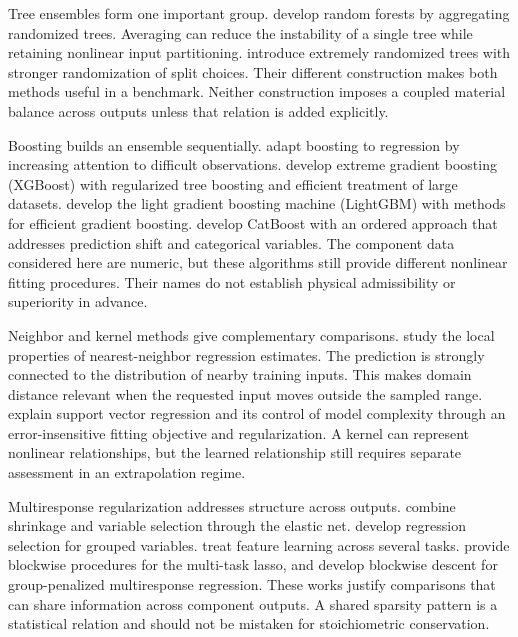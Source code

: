 Tree ensembles form one important group. \citet{Breiman2001} develop random forests by aggregating randomized trees. Averaging can reduce the instability of a single tree while retaining nonlinear input partitioning. \citet{Geurts2006} introduce extremely randomized trees with stronger randomization of split choices. Their different construction makes both methods useful in a benchmark. Neither construction imposes a coupled material balance across outputs unless that relation is added explicitly.

Boosting builds an ensemble sequentially. \citet{Drucker1997} adapt boosting to regression by increasing attention to difficult observations. \citet{ChenGuestrin2016} develop extreme gradient boosting (XGBoost) with regularized tree boosting and efficient treatment of large datasets. \citet{Ke2017} develop the light gradient boosting machine (LightGBM) with methods for efficient gradient boosting. \citet{Prokhorenkova2018} develop CatBoost with an ordered approach that addresses prediction shift and categorical variables. The component data considered here are numeric, but these algorithms still provide different nonlinear fitting procedures. Their names do not establish physical admissibility or superiority in advance.

Neighbor and kernel methods give complementary comparisons. \citet{Mack1981} study the local properties of nearest-neighbor regression estimates. The prediction is strongly connected to the distribution of nearby training inputs. This makes domain distance relevant when the requested input moves outside the sampled range. \citet{SmolaScholkopf2004} explain support vector regression and its control of model complexity through an error-insensitive fitting objective and regularization. A kernel can represent nonlinear relationships, but the learned relationship still requires separate assessment in an extrapolation regime.

Multiresponse regularization addresses structure across outputs. \citet{Zou2005} combine shrinkage and variable selection through the elastic net. \citet{Yuan2006} develop regression selection for grouped variables. \citet{Argyriou2008} treat feature learning across several tasks. \citet{Liu2009} provide blockwise procedures for the multi-task lasso, and \citet{Simon2013} develop blockwise descent for group-penalized multiresponse regression. These works justify comparisons that can share information across component outputs. A shared sparsity pattern is a statistical relation and should not be mistaken for stoichiometric conservation.

